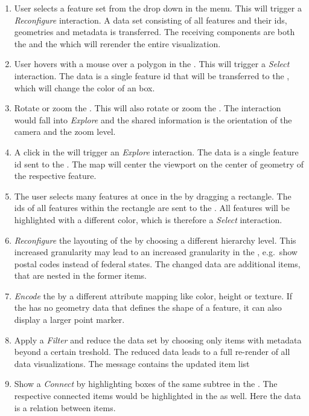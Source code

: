     \begin{enumerate}
      \item
        User selects a feature set from the drop down in the menu. This will trigger a \emph{Reconfigure} interaction. A data set consisting of all features and their ids, geometries and metadata is transferred. The receiving components are both the \tmap{} and the \map{} which will rerender the entire visualization.
      \item
        User hovers with a mouse over a polygon in the \map{}. This will trigger a \emph{Select} interaction. The data is a single feature id that will be transferred to the \tmap{}, which will change the color of an box.
      \item
        Rotate or zoom the \tmap{}. This will also rotate or zoom the \map{}. The interaction would fall into \emph{Explore} and the shared information is the orientation of the camera and the zoom level.
      \item
        A click in the \tmap{} will trigger an \emph{Explore} interaction. The data is a single feature id sent to the \map{}. The map will center the viewport on the center of geometry of the respective feature.
      \item
        The user selects many features at once in the \map{} by dragging a rectangle. The ids of all features within the rectangle are sent to the \tmap{}. All features will be highlighted with a different color, which is therefore a \emph{Select} interaction.
      \item
        \emph{Reconfigure} the layouting of the \tmap{} by choosing a different hierarchy level. This increased granularity may lead to an increased granularity in the \map{}, e.g.\ show postal codes instead of federal states. The changed data are additional items, that are nested in the former items.
      \item
        \emph{Encode} the \tmap{} by a different attribute mapping like color, height or texture. If the \map{} has no geometry data that defines the shape of a feature, it can also display a larger point marker.
      \item
        Apply a \emph{Filter} and reduce the data set by choosing only items with metadata beyond a certain treshold. The reduced data leads to a full re-render of all data visualizations. The message contains the updated item list
  \item
    Show a \emph{Connect} by highlighting boxes of the same subtree in the \tmap{}. The respective connected items would be highlighted in the \map{} as well. Here the data is a relation between items.
    \end{enumerate}


